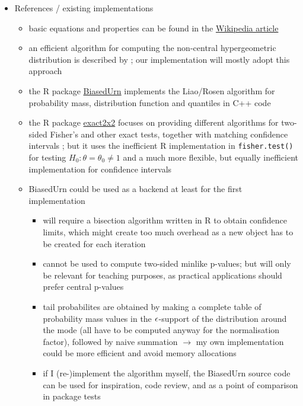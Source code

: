 \documentclass[a4paper]{article}
\begin{document}
\begin{itemize}
\item References / existing implementations
  \begin{itemize}
  \item basic equations and properties can be found in the \href{https://en.wikipedia.org/wiki/Fisher's_noncentral_hypergeometric_distribution}{Wikipedia article}
  \item an efficient algorithm for computing the non-central hypergeometric distribution is described by \citet{Liao:Rosen:01}; our implementation will mostly adopt this approach
  \item the R package \href{https://cran.r-project.org/web/packages/BiasedUrn/}{BiasedUrn} implements the Liao/Rosen algorithm for probability mass, distribution function and quantiles in C++ code
  \item the R package \href{https://cran.r-project.org/web/packages/exact2x2/}{exact2x2} focuses on providing different algorithms for two-sided Fisher's and other exact tests, together with matching confidence intervals \citet{Fay:10a}; but it uses the inefficient R implementation in \texttt{fisher.test()} for testing $H_0: \theta = \theta_0 \neq 1$ and a much more flexible, but equally inefficient implementation for confidence intervals
  \item BiasedUrn could be used as a backend at least for the first implementation
    \begin{itemize}
    \item will require a bisection algorithm written in R to obtain confidence limits, which might create too much overhead as a new object has to be created for each iteration
    \item cannot be used to compute two-sided minlike p-values; but will only be relevant for teaching purposes, as practical applications should prefer central p-values
    \item tail probabilites are obtained by making a complete table of probability mass values in the $\epsilon$-support of the distribution around the mode (all have to be computed anyway for the normalisation factor), followed by naive summation $\to$ my own implementation could be more efficient and avoid memory allocations
    \item if I (re-)implement the algorithm myself, the BiasedUrn source code can be used for inspiration, code review, and as a point of comparison in package tests
    \end{itemize}
  \end{itemize}
\end{itemize}
\end{document}
